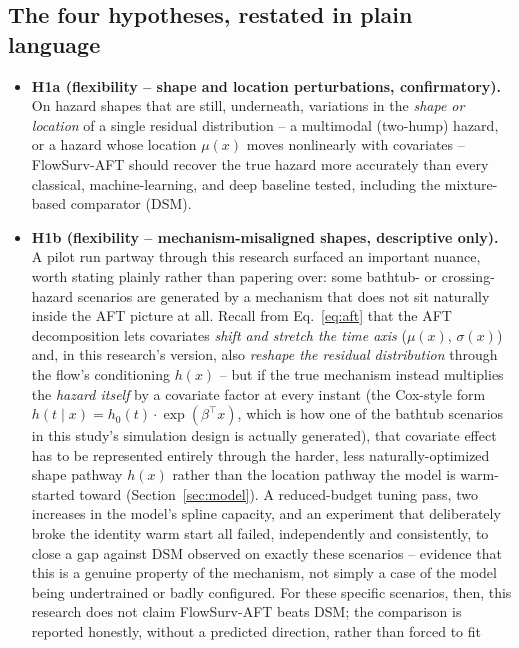 \documentclass[11pt]{article}
\begin{document}
\subsection{The four hypotheses, restated in plain language}
\begin{itemize}
  \item \textbf{H1a (flexibility -- shape and location perturbations,
    confirmatory).} On hazard shapes that are still, underneath,
    variations in the \emph{shape or location} of a single residual
    distribution -- a multimodal (two-hump) hazard, or a hazard whose
    location $\mu(x)$ moves nonlinearly with covariates -- FlowSurv-AFT
    should recover the true hazard more accurately than every classical,
    machine-learning, and deep baseline tested, including the
    mixture-based comparator (DSM).
  \item \textbf{H1b (flexibility -- mechanism-misaligned shapes,
    descriptive only).} A pilot run partway through this research
    surfaced an important nuance, worth stating plainly rather than
    papering over: some bathtub- or crossing-hazard scenarios are
    generated by a mechanism that does not sit naturally inside the AFT
    picture at all. Recall from Eq.~\eqref{eq:aft} that the AFT
    decomposition lets covariates \emph{shift and stretch the time axis}
    ($\mu(x)$, $\sigma(x)$) and, in this research's version, also
    \emph{reshape the residual distribution} through the flow's
    conditioning $h(x)$ -- but if the true mechanism instead multiplies
    the \emph{hazard itself} by a covariate factor at every instant (the
    Cox-style form $h(t\mid x) = h_0(t)\cdot\exp(\beta^\top x)$, which is
    how one of the bathtub scenarios in this study's simulation design
    is actually generated), that covariate effect has to be represented
    entirely through the harder, less naturally-optimized shape pathway
    $h(x)$ rather than the location pathway the model is warm-started
    toward (Section~\ref{sec:model}). A reduced-budget tuning pass, two
    increases in the model's spline capacity, and an experiment that
    deliberately broke the identity warm start all failed, independently
    and consistently, to close a gap against DSM observed on exactly
    these scenarios -- evidence that this is a genuine property of the
    mechanism, not simply a case of the model being undertrained or
    badly configured. For these specific scenarios, then, this research
    does not claim FlowSurv-AFT beats DSM; the comparison is reported
    honestly, without a predicted direction, rather than forced to fit

\end{itemize}
\end{document}
